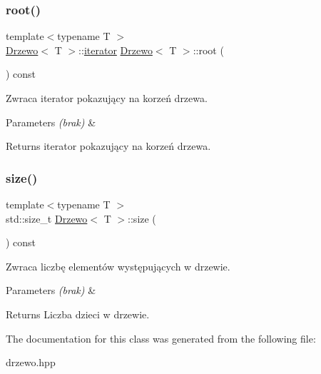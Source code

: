 \subsubsection{\texorpdfstring{root()}{root()}}
{\footnotesize\ttfamily template$<$typename T $>$ \\
\hyperlink{class_drzewo}{Drzewo}$<$ T $>$\+::\hyperlink{class_drzewo_1_1iterator}{iterator} \hyperlink{class_drzewo}{Drzewo}$<$ T $>$\+::root (\begin{DoxyParamCaption}{ }\end{DoxyParamCaption}) const\hspace{0.3cm}{\ttfamily [inline]}}

Zwraca iterator pokazujący na korzeń drzewa.


\begin{DoxyParams}{Parameters}
{\em (brak)} & \\
\hline
\end{DoxyParams}
\begin{DoxyReturn}{Returns}
iterator pokazujący na korzeń drzewa. 
\end{DoxyReturn}
\mbox{\label{class_drzewo_a778ee17b16674b9d0577d22f5d55fa04}} 
\subsubsection{\texorpdfstring{size()}{size()}}
{\footnotesize\ttfamily template$<$typename T $>$ \\
std\+::size\+\_\+t \hyperlink{class_drzewo}{Drzewo}$<$ T $>$\+::size (\begin{DoxyParamCaption}{ }\end{DoxyParamCaption}) const\hspace{0.3cm}{\ttfamily [inline]}}

Zwraca liczbę elementów występujących w drzewie.


\begin{DoxyParams}{Parameters}
{\em (brak)} & \\
\hline
\end{DoxyParams}
\begin{DoxyReturn}{Returns}
Liczba dzieci w drzewie. 
\end{DoxyReturn}


The documentation for this class was generated from the following file\+:\begin{DoxyCompactItemize}
\item 
drzewo.\+hpp\end{DoxyCompactItemize}
